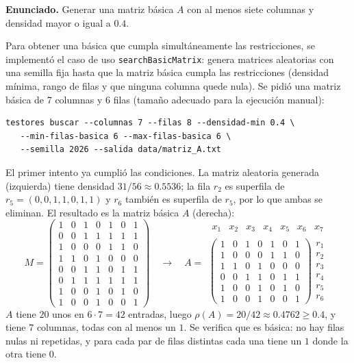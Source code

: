 \documentclass[11pt, a4paper]{article}
\theoremstyle{definition}
\theoremstyle{plain}
\newcommand{\x}[1]{x_{#1}}
\begin{document}
\textbf{Enunciado.} Generar una matriz básica $A$ con al menos siete columnas
y densidad mayor o igual a $0.4$.

Para obtener una básica que cumpla simultáneamente las restricciones,
se implementó el caso de uso
\texttt{searchBasic\allowbreak Matrix}: genera matrices aleatorias con una semilla fija hasta
que la matriz básica cumpla las restricciones (densidad mínima, rango de filas y
que ninguna columna quede nula). Se pidió una matriz básica de 7 columnas y
6 filas (tamaño adecuado para la ejecución manual):

\begin{Verbatim}[fontsize=\small, frame=single]
testores buscar --columnas 7 --filas 8 --densidad-min 0.4 \
   --min-filas-basica 6 --max-filas-basica 6 \
   --semilla 2026 --salida data/matriz_A.txt
\end{Verbatim}

El primer intento ya cumplió las condiciones. La matriz aleatoria generada
(izquierda) tiene densidad $31/56\approx 0.5536$; la fila $r_2$ es superfila de
$r_5=(0,0,1,1,0,1,1)$ y $r_6$ también es superfila de $r_5$, por lo que ambas se
eliminan. El resultado es la matriz básica $A$ (derecha):
\[
M=\begin{pmatrix}
1&0&1&0&1&0&1\\
0&0&1&1&1&1&1\\
1&0&0&0&1&1&0\\
1&1&0&1&0&0&0\\
0&0&1&1&0&1&1\\
0&1&1&1&1&1&1\\
1&0&0&1&0&1&0\\
1&0&0&1&0&0&1
\end{pmatrix}
\quad\longrightarrow\quad
A=\begin{array}{c}
\begin{array}{ccccccc} \x1&\x2&\x3&\x4&\x5&\x6&\x7\end{array}\\
\begin{pmatrix}
1&0&1&0&1&0&1\\
1&0&0&0&1&1&0\\
1&1&0&1&0&0&0\\
0&0&1&1&0&1&1\\
1&0&0&1&0&1&0\\
1&0&0&1&0&0&1
\end{pmatrix}
\begin{array}{c} r_1\\ r_2\\ r_3\\ r_4\\ r_5\\ r_6\end{array}
\end{array}
\]
$A$ tiene $20$ unos en $6\cdot 7=42$ entradas, luego
$\rho(A)=20/42\approx \mathbf{0.4762}\ge 0.4$, y tiene $7$ columnas, todas con al
menos un $1$. Se verifica que es básica: no hay filas nulas ni repetidas, y para
cada par de filas distintas cada una tiene un $1$ donde la otra tiene $0$.
\end{document}
